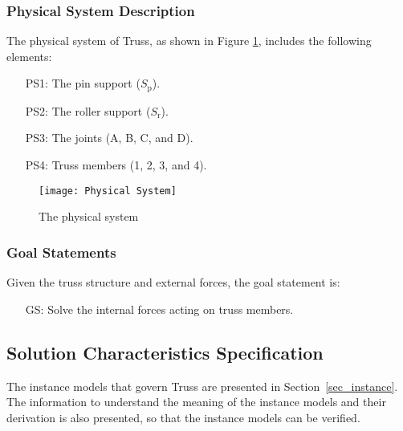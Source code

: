\documentclass[12pt]{article}
\newcounter{goalnum} %
\begin{document}
\subsubsection{Physical System Description} \label{sec_phySystDescrip}

The physical system of Truss, as shown in Figure \ref{Fig_PhysicalSystem},
includes the following elements:

\begin{itemize}

\item[PS1:] The pin support ($S_\text{p}$).

\item[PS2:] The roller support ($S_\text{r}$).

\item[PS3:] The joints (A, B, C, and D).

\item[PS4:] Truss members (1, 2, 3, and 4).

\end{itemize}


\begin{figure}[h!]
	\begin{center}
		\texttt{[image: Physical System]}
		\caption{The physical system}
		\label{Fig_PhysicalSystem} 
	\end{center}
\end{figure}

\subsubsection{Goal Statements}\label{sec_goal}

\noindent 
Given the truss structure and external forces, the goal statement is:

\begin{itemize}

\item[GS\refstepcounter{goalnum}\thegoalnum \label{G_solforce}:] 
{Solve the internal forces acting on truss members.}

\end{itemize}

\subsection{Solution Characteristics Specification}

The instance models that govern Truss are presented in 
Section~\ref{sec_instance}.  The information to understand the meaning of the
instance models and their derivation is also presented, so that the instance
models can be verified.
\end{document}
